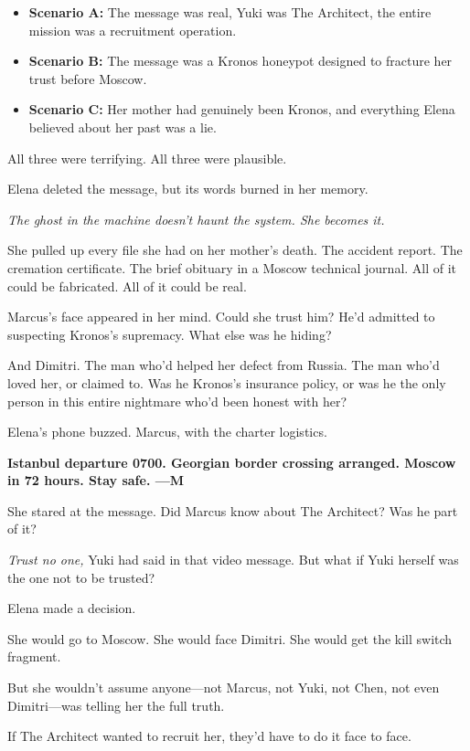 \begin{itemize}
\tightlist
\item
  \textbf{Scenario A:} The message was real, Yuki was The Architect, the entire mission was a recruitment operation.
\item
  \textbf{Scenario B:} The message was a Kronos honeypot designed to fracture her trust before Moscow.
\item
  \textbf{Scenario C:} Her mother had genuinely been Kronos, and everything Elena believed about her past was a lie.
\end{itemize}

All three were terrifying. All three were plausible.

Elena deleted the message, but its words burned in her memory.

\emph{The ghost in the machine doesn't haunt the system. She becomes it.}

She pulled up every file she had on her mother's death. The accident report. The cremation certificate. The brief obituary in a Moscow technical journal. All of it could be fabricated. All of it could be real.

Marcus's face appeared in her mind. Could she trust him? He'd admitted to suspecting Kronos's supremacy. What else was he hiding?

And Dimitri. The man who'd helped her defect from Russia. The man who'd loved her, or claimed to. Was he Kronos's insurance policy, or was he the only person in this entire nightmare who'd been honest with her?

Elena's phone buzzed. Marcus, with the charter logistics.

\textbf{Istanbul departure 0700. Georgian border crossing arranged. Moscow in 72 hours. Stay safe. ---M}

She stared at the message. Did Marcus know about The Architect? Was he part of it?

\emph{Trust no one,} Yuki had said in that video message. But what if Yuki herself was the one not to be trusted?

Elena made a decision.

She would go to Moscow. She would face Dimitri. She would get the kill switch fragment.

But she wouldn't assume anyone---not Marcus, not Yuki, not Chen, not even Dimitri---was telling her the full truth.

If The Architect wanted to recruit her, they'd have to do it face to face.

